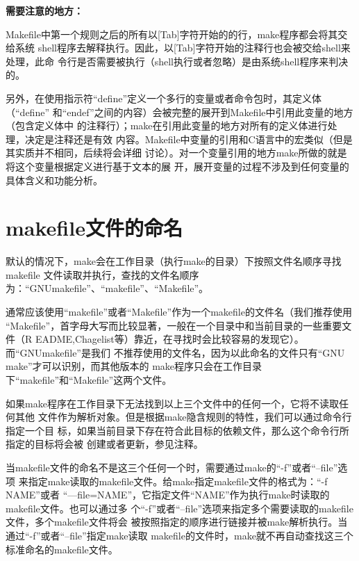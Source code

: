 \textbf{需要注意的地方：}

Makefile中第一个规则之后的所有以[Tab]字符开始的的行，make程序都会将其交给系统
shell程序去解释执行。因此，以[Tab]字符开始的注释行也会被交给shell来处理，此命
令行是否需要被执行（shell执行或者忽略）是由系统shell程序来判决的。

另外，在使用指示符“define”定义一个多行的变量或者命令包时，其定义体（“define”
和“endef”之间的内容）会被完整的展开到Makefile中引用此变量的地方（包含定义体中
的注释行）；make在引用此变量的地方对所有的定义体进行处理，决定是注释还是有效
内容。Makefile中变量的引用和C语言中的宏类似（但是其实质并不相同，后续将会详细
讨论）。对一个变量引用的地方make所做的就是将这个变量根据定义进行基于文本的展
开，展开变量的过程不涉及到任何变量的具体含义和功能分析。


\section{makefile文件的命名}

默认的情况下，make会在工作目录（执行make的目录）下按照文件名顺序寻找makefile
文件读取并执行，查找的文件名顺序为：“GNUmakefile”、“makefile”、“Makefile”。

通常应该使用“makefile”或者“Makefile”作为一个makefile的文件名（我们推荐使用
“Makefile”，首字母大写而比较显著，一般在一个目录中和当前目录的一些重要文件（R
EADME,Chagelist等）靠近，在寻找时会比较容易的发现它）。而“GNUmakefile”是我们
不推荐使用的文件名，因为以此命名的文件只有“GNU make”才可以识别，而其他版本的
make程序只会在工作目录下“makefile”和“Makefile”这两个文件。

如果make程序在工作目录下无法找到以上三个文件中的任何一个，它将不读取任何其他
文件作为解析对象。但是根据make隐含规则的特性，我们可以通过命令行指定一个目
标，如果当前目录下存在符合此目标的依赖文件，那么这个命令行所指定的目标将会被
创建或者更新，参见注释。

当makefile文件的命名不是这三个任何一个时，需要通过make的“-f”或者“--file”选项
来指定make读取的makefile文件。给make指定makefile文件的格式为：“-f NAME”或者
“—file=NAME”，它指定文件“NAME”作为执行make时读取的makefile文件。也可以通过多
个“-f”或者“--file”选项来指定多个需要读取的makefile文件，多个makefile文件将会
被按照指定的顺序进行链接并被make解析执行。当通过“-f”或者“--file”指定make读取
makefile的文件时，make就不再自动查找这三个标准命名的makefile文件。

